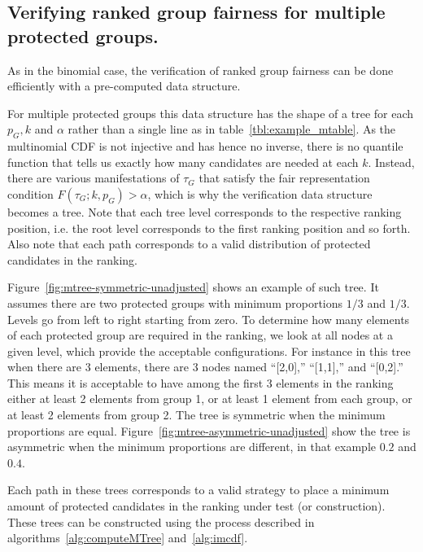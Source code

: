\subsection{Verifying ranked group fairness for multiple protected groups.}
As in the binomial case, the verification of ranked group fairness can be done efficiently with a pre-computed data structure.

%
For multiple protected groups this data structure has the shape of a tree for each $ p_G, k $ and $ \alpha $ rather than a single line as in table~\ref{tbl:example_mtable}.
%
As the multinomial CDF is not injective and has hence no inverse, there is no quantile function that tells us exactly how many candidates are needed at each $ k $.
%
Instead, there are various manifestations of $ \tau_G $ that satisfy the fair representation condition $F(\tau_G;k,p_G) > \alpha$, which is why the verification data structure becomes a tree.
%
Note that each tree level corresponds to the respective ranking position, i.e. the root level corresponds to the first ranking position and so forth.
%
Also note that each path corresponds to a valid distribution of protected candidates in the ranking.
%

%
Figure~\ref{fig:mtree-symmetric-unadjusted} shows an example of such tree. It assumes there are two protected groups with minimum proportions $1/3$ and $1/3$. Levels go from left to right starting from zero. To determine how many elements of each protected group are required in the ranking, we look at all nodes at a given level, which provide the acceptable configurations.
%
For instance in this tree when there are 3 elements, there are 3 nodes named ``[2,0],'' ``[1,1],'' and ``[0,2].'' This means it is acceptable to have among the first 3 elements in the ranking either at least 2 elements from group 1, or at least 1 element from each group, or at least 2 elements from group 2.
%
The tree is symmetric when the minimum proportions are equal. Figure~\ref{fig:mtree-asymmetric-unadjusted} show the tree is asymmetric when the minimum proportions are different, in that example $0.2$ and $0.4$.

Each path in these trees corresponds to a valid strategy to place a minimum amount of protected candidates in the ranking under test (or construction).
%
These trees can be constructed using the process described in algorithms~\ref{alg:computeMTree} and~\ref{alg:imcdf}.
%


